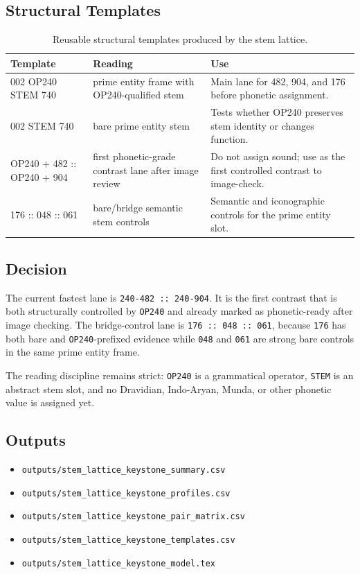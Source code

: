 \subsection{Structural Templates}

\begin{table}[htbp]
\centering
\scriptsize
\begin{tabular}{p{}p{}p{}}
\toprule
\textbf{Template} & \textbf{Reading} & \textbf{Use} \\
\midrule
002 OP240 STEM 740 & prime entity frame with OP240-qualified stem & Main lane for 482, 904, and 176 before phonetic assignment. \\
002 STEM 740 & bare prime entity stem & Tests whether OP240 preserves stem identity or changes function. \\
OP240 + 482 :: OP240 + 904 & first phonetic-grade contrast lane after image review & Do not assign sound; use as the first controlled contrast to image-check. \\
176 :: 048 :: 061 & bare/bridge semantic stem controls & Semantic and iconographic controls for the prime entity slot. \\
\bottomrule
\end{tabular}
\caption{Reusable structural templates produced by the stem lattice.}
\label{tab:stem-lattice-keystone-templates}
\end{table}

\subsection{Decision}

The current fastest lane is \texttt{240-482 :: 240-904}. It is the first contrast that is both structurally controlled by \texttt{OP240} and already marked as phonetic-ready after image checking. The bridge-control lane is \texttt{176 :: 048 :: 061}, because \texttt{176} has both bare and \texttt{OP240}-prefixed evidence while \texttt{048} and \texttt{061} are strong bare controls in the same prime entity frame.

The reading discipline remains strict: \texttt{OP240} is a grammatical operator, \texttt{STEM} is an abstract stem slot, and no Dravidian, Indo-Aryan, Munda, or other phonetic value is assigned yet.

\subsection{Outputs}

\begin{itemize}
  \item \texttt{outputs/stem\_lattice\_keystone\_summary.csv}
  \item \texttt{outputs/stem\_lattice\_keystone\_profiles.csv}
  \item \texttt{outputs/stem\_lattice\_keystone\_pair\_matrix.csv}
  \item \texttt{outputs/stem\_lattice\_keystone\_templates.csv}
  \item \texttt{outputs/stem\_lattice\_keystone\_model.tex}
\end{itemize}
